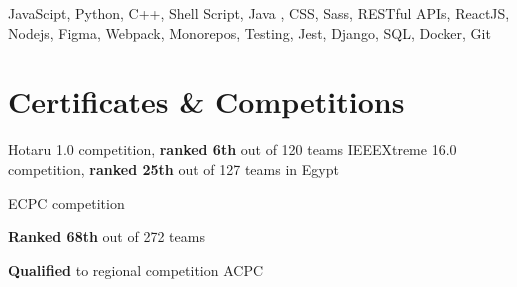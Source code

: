 \documentclass[legalpaper, oneside, final]{scrartcl}
\begin{document}
\begin{center}
%
%

\parbox{\linewidth} {
JavaScipt, Python, C++, Shell Script, Java , CSS, Sass, RESTful APIs, ReactJS, Nodejs, Figma, Webpack, Monorepos, Testing, Jest, Django, SQL, Docker, Git
}


\section{Certificates \& Competitions}

\begin{datelist}
    {\quad Hotaru 1.0 competition, \textbf{ranked 6th} out of 120 teams}
    {\quad IEEEXtreme 16.0 competition, \textbf{ranked 25th} out of 127 teams in Egypt}
    {
        \quad ECPC competition
        \begin{items}
        \item \textbf{Ranked 68th} out of 272 teams
        \item \textbf{Qualified} to regional competition ACPC
        \end{items}
    }
\end{datelist}



\end{center}
\end{document}
